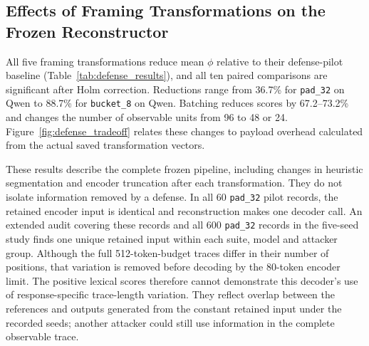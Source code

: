 \documentclass[electronics,article,submit,pdftex,moreauthors]{Definitions/mdpi}
\begin{document}
\begin{table}[ht]
\centering
\caption{Separate cohorts with newly generated, verified full-sequence references ($N=300$ per model; 512-token victim limit; all segments, three T5 samples per segment and 80-token T5 input and output limits). Mean-$\phi$ intervals use 10,000 resamples of 60 scenarios. These rows form a targeted reference-validation experiment and are analyzed separately from the seven archived-reference cohorts. EOS indicates end-of-sequence termination, not reconstruction correctness.}
\label{tab:fresh_results}
\end{table}

\subsection{Effects of Framing Transformations on the Frozen Reconstructor}\label{sec:defense}
All five framing transformations reduce mean $\phi$ relative to their defense-pilot baseline (Table~\ref{tab:defense_results}), and all ten paired comparisons are significant after Holm correction. Reductions range from 36.7\% for \texttt{pad\_32} on Qwen to 88.7\% for \texttt{bucket\_8} on Qwen. Batching reduces scores by 67.2--73.2\% and changes the number of observable units from 96 to 48 or 24. Figure~\ref{fig:defense_tradeoff} relates these changes to payload overhead calculated from the actual saved transformation vectors.

These results describe the complete frozen pipeline, including changes in heuristic segmentation and encoder truncation after each transformation. They do not isolate information removed by a defense. In all 60 \texttt{pad\_32} pilot records, the retained encoder input is identical and reconstruction makes one decoder call. An extended audit covering these records and all 600 \texttt{pad\_32} records in the five-seed study finds one unique retained input within each suite, model and attacker group. Although the full 512-token-budget traces differ in their number of positions, that variation is removed before decoding by the 80-token encoder limit. The positive lexical scores therefore cannot demonstrate this decoder's use of response-specific trace-length variation. They reflect overlap between the references and outputs generated from the constant retained input under the recorded seeds; another attacker could still use information in the complete observable trace.
\end{document}
